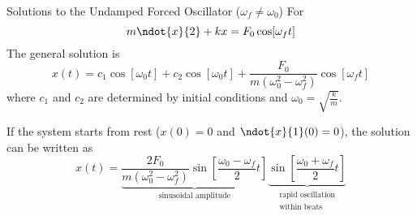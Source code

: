 \documentclass{beamer}
\begin{document}
\begin{frame}
\begin{block}{Solutions to the Undamped Forced Oscillator ($\omega_f\neq\omega_0$)}
For
\begin{equation*}
m\ndot{x}{2}+kx=F_0\cos[\omega_f t]
\end{equation*}
The general solution is
\begin{equation*}
x(t)=c_1\cos[\omega_0 t]+c_2\cos[\omega_0 t] + \dfrac{F_0}{m\left(\omega_0^2-\omega_f^2\right)}\cos[\omega_f t]
\end{equation*}
where $c_1$ and $c_2$ are determined by initial conditions and $\omega_0=\sqrt{\tfrac{k}{m}}$.

\vspace{2mm}
If the system starts from rest ($x(0)=0$ and $\ndot{x}{1}(0)=0$), the solution can be written as
\begin{equation*}
x(t)=\underbrace{\dfrac{2F_0}{m\left(\omega_0^2-\omega_f^2\right)}\sin[\dfrac{\omega_0-\omega_f}{2}t]}_{\text{sinusoidal amplitude}}
\underbrace{\sin[\dfrac{\omega_0+\omega_f}{2}t]}_{\substack{\text{rapid oscillation} \\ \text{within beats}}}
\end{equation*}
\end{block}
\end{frame}
\end{document}
